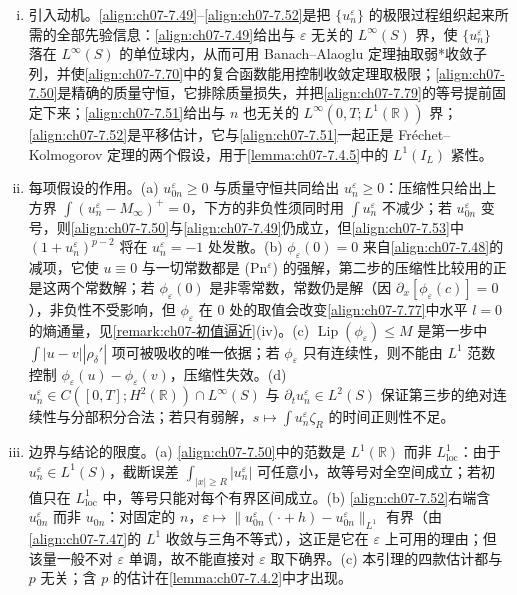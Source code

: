 ﻿\documentclass[../../main.tex]{subfiles}%
\begin{document}
\begin{remark}\label{remark:ch07-7.4.1解估计}
\begin{enumerate}[(i)]
\item 引入动机。\eqref{align:ch07-7.49}--\eqref{align:ch07-7.52}是把 $\{u_n^\varepsilon\}$ 的极限过程组织起来所需的全部先验信息：\eqref{align:ch07-7.49}给出与 $\varepsilon$ 无关的 $L^\infty(S)$ 界，使 $\{u_n^\varepsilon\}$ 落在 $L^\infty(S)$ 的单位球内，从而可用 Banach--Alaoglu 定理抽取弱*收敛子列，并使\eqref{align:ch07-7.70}中的复合函数能用控制收敛定理取极限；\eqref{align:ch07-7.50}是精确的质量守恒，它排除质量损失，并把\eqref{align:ch07-7.79}的等号提前固定下来；\eqref{align:ch07-7.51}给出与 $n$ 也无关的 $L^\infty(0,T;L^1(\mathbb{R}))$ 界；\eqref{align:ch07-7.52}是平移估计，它与\eqref{align:ch07-7.51}一起正是 Fréchet--Kolmogorov 定理的两个假设，用于\cref{lemma:ch07-7.4.5}中的 $L^1(I_L)$ 紧性。
\item 每项假设的作用。(a) $u_{0n}^\varepsilon\geqslant0$ 与质量守恒共同给出 $u_n^\varepsilon\geqslant0$：压缩性只给出上方界 $\int(u_n^\varepsilon-M_\infty)^+=0$，下方的非负性须同时用 $\int u_n^\varepsilon$ 不减少；若 $u_{0n}^\varepsilon$ 变号，则\eqref{align:ch07-7.50}与\eqref{align:ch07-7.49}仍成立，但\eqref{align:ch07-7.53}中 $(1+u_n^\varepsilon)^{p-2}$ 将在 $u_n^\varepsilon=-1$ 处发散。(b) $\phi_\varepsilon(0)=0$ 来自\eqref{align:ch07-7.48}的减项，它使 $u\equiv0$ 与一切常数都是 (Pn$^\varepsilon$) 的强解，第二步的压缩性比较用的正是这两个常数解；若 $\phi_\varepsilon(0)$ 是非零常数，常数仍是解（因 $\partial_x[\phi_\varepsilon(c)]=0$），非负性不受影响，但 $\phi_\varepsilon$ 在 $0$ 处的取值会改变\eqref{align:ch07-7.77}中水平 $l=0$ 的熵通量，见\cref{remark:ch07-初值逼近}(iv)。(c) $\operatorname{Lip}(\phi_\varepsilon)\leqslant M$ 是第一步中 $\int|u-v||\rho_\delta'|$ 项可被吸收的唯一依据；若 $\phi_\varepsilon$ 只有连续性，则不能由 $L^1$ 范数控制 $\phi_\varepsilon(u)-\phi_\varepsilon(v)$，压缩性失效。(d) $u_n^\varepsilon\in C([0,T];H^2(\mathbb{R}))\cap L^\infty(S)$ 与 $\partial_tu_n^\varepsilon\in L^2(S)$ 保证第三步的绝对连续性与分部积分合法；若只有弱解，$s\mapsto\int u_n^\varepsilon\zeta_R$ 的时间正则性不足。
\item 边界与结论的限度。(a) \eqref{align:ch07-7.50}中的范数是 $L^1(\mathbb{R})$ 而非 $L^1_{\mathrm{loc}}$：由于 $u_n^\varepsilon\in L^1(S)$，截断误差 $\int_{|x|\geqslant R}|u_n^\varepsilon|$ 可任意小，故等号对全空间成立；若初值只在 $L^1_{\mathrm{loc}}$ 中，等号只能对每个有界区间成立。(b) \eqref{align:ch07-7.52}右端含 $u_{0n}^\varepsilon$ 而非 $u_{0n}$：对固定的 $n$，$\varepsilon\mapsto\|u_{0n}^\varepsilon(\cdot+h)-u_{0n}^\varepsilon\|_{L^1}$ 有界（由\eqref{align:ch07-7.47}的 $L^1$ 收敛与三角不等式），这正是它在 $\varepsilon$ 上可用的理由；但该量一般不对 $\varepsilon$ 单调，故不能直接对 $\varepsilon$ 取下确界。(c) 本引理的四款估计都与 $p$ 无关；含 $p$ 的估计在\cref{lemma:ch07-7.4.2}中才出现。
\end{enumerate}
\end{remark}
\end{document}
